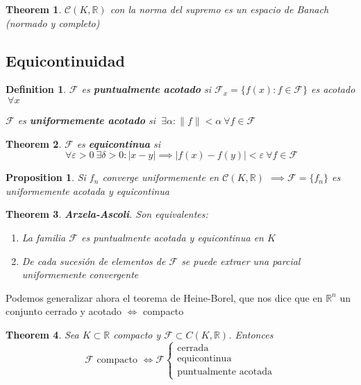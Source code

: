 \documentclass[leqno]{article}
\newtheorem*{definition}{Definition}
\newtheorem*{theorem}{Theorem}
\newtheorem*{proposition}{Proposition}
\begin{document}
\begin{theorem}
  $\mathcal{C}(K, \mathbb{R}) $ con la norma del supremo es un espacio de Banach (normado y completo)
\end{theorem}

\subsection{Equicontinuidad}

\begin{definition}
$\mathcal{F}$ es \textbf{puntualmente acotado} si $\mathcal{F}_x = \{f(x): f\in \mathcal{F}\}$ es acotado $\ \forall x$

$\mathcal{F}$ es \textbf{uniformemente acotado} si $\ \exists \alpha : \|f\|<\alpha \ \forall f\in \mathcal{F}$
\end{definition}

\begin{theorem}
$\mathcal{F}$ es \textbf{equicontinua} si 
\[
\ \forall \varepsilon >0 \ \exists \delta >0 : |x-y| \implies |f(x)-f(y)| < \varepsilon \ \forall f\in \mathcal{F}
\] 
\end{theorem}

\begin{proposition}
Si $f_n$ converge uniformemente en $\mathcal{C}(K, \mathbb{R})$ $\implies \mathcal{F} = \{f_n\}$ es uniformemente acotada y equicontinua
\end{proposition}

\begin{theorem}
\textbf{Arzela-Ascoli}. Son equivalentes:
\begin{enumerate}[topsep=0pt, itemsep=0pt]
  \item La familia $\mathcal{F}$ es puntualmente acotada y equicontinua en $K$
  \item De cada sucesión de elementos de $\mathcal{F}$ se puede extraer una parcial uniformemente convergente
\end{enumerate}
\end{theorem}
Podemos generalizar ahora el teorema de Heine-Borel, que nos dice que en $\mathbb{R}^n$ un conjunto cerrado y acotado $\iff$ compacto
\begin{theorem}
Sea $K\subset \mathbb{R}$ compacto y $\mathcal{F}\subset C(K, \mathbb{R})$. Entonces
\[
  \mathcal{F} \text{ compacto } \iff \mathcal{F} \begin{cases} 
	\text{cerrada}\\
	\text{equicontinua}\\
	\text{puntualmente acotada}
  \end{cases}
\] 
\end{theorem}
\end{document}
